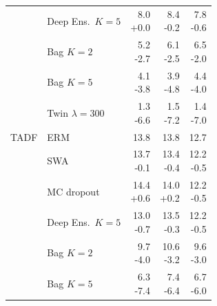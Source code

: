 {\begin{longtable}{llrrr}
     & Deep Ens.\ $K{=}5$ & \makecell[r]{8.0\\+0.0} & \makecell[r]{8.4\\-0.2} & \makecell[r]{7.8\\-0.6} \\
     & Bag $K{=}2$ & \makecell[r]{5.2\\-2.7} & \makecell[r]{6.1\\-2.5} & \makecell[r]{6.5\\-2.0} \\
     & Bag $K{=}5$ & \makecell[r]{4.1\\-3.8} & \makecell[r]{3.9\\-4.8} & \makecell[r]{4.4\\-4.0} \\
     & Twin $\lambda{=}300$ & \makecell[r]{1.3\\-6.6} & \makecell[r]{1.5\\-7.2} & \makecell[r]{1.4\\-7.0} \\
    \midrule
    TADF & ERM & \makecell[r]{13.8\\\strut} & \makecell[r]{13.8\\\strut} & \makecell[r]{12.7\\\strut} \\
     & SWA & \makecell[r]{13.7\\-0.1} & \makecell[r]{13.4\\-0.4} & \makecell[r]{12.2\\-0.5} \\
     & MC dropout & \makecell[r]{14.4\\+0.6} & \makecell[r]{14.0\\+0.2} & \makecell[r]{12.2\\-0.5} \\
     & Deep Ens.\ $K{=}5$ & \makecell[r]{13.0\\-0.7} & \makecell[r]{13.5\\-0.3} & \makecell[r]{12.2\\-0.5} \\
     & Bag $K{=}2$ & \makecell[r]{9.7\\-4.0} & \makecell[r]{10.6\\-3.2} & \makecell[r]{9.6\\-3.0} \\
     & Bag $K{=}5$ & \makecell[r]{6.3\\-7.4} & \makecell[r]{7.4\\-6.4} & \makecell[r]{6.7\\-6.0} \\

\end{longtable}}
